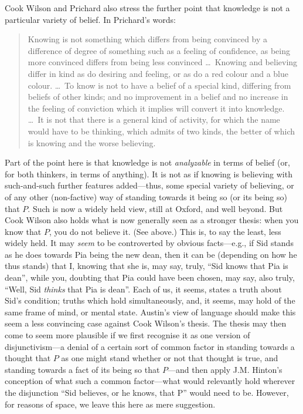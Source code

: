 Cook Wilson and Prichard also stress the further point that knowledge is not a particular variety of belief. In Prichard’s words:
\begin{quote}
	Knowing is not something which differs from being convinced by a difference of degree of something such as a feeling of confidence, as being more convinced differs from being less convinced \ldots\ Knowing and believing differ in kind as do desiring and feeling, or as do a red colour and a blue colour. \ldots\ To know is not to have a belief of a special kind, differing from beliefs of other kinds; and no improvement in a belief and no increase in the feeling of conviction which it implies will convert it into knowledge. \ldots\ It is not that there is a general kind of activity, for which the name would have to be thinking, which admits of two kinds, the better of which is knowing and the worse believing. \citet[87--88]{Prichard:1950tg}
\end{quote}
Part of the point here is that knowledge is not \emph{analyzable} in terms of belief (or, for both thinkers, in terms of anything). It is not as if knowing is believing with such-and-such further features added---thus, some special variety of believing, or of any other (non-factive) way of standing towards it being so (or its being so) that \( P \). Such is now a widely held view, still at Oxford, and well beyond. But Cook Wilson also holds what is now generally seen as a stronger thesis: when you know that \( P \), you do not believe it. (See above.) This is, to say the least, less widely held. It may \emph{seem} to be controverted by obvious facts---e.g., if Sid stands as he does towards Pia being the new dean, then it can be (depending on how he thus stands) that I, knowing that she is, may say, truly, ``Sid knows that Pia is dean'', while you, doubting that Pia could have been chosen, may say, also truly, ``Well, Sid \emph{thinks} that Pia is dean''. Each of us, it seems, states a truth about Sid's condition; truths which hold simultaneously, and, it seems, may hold of the same frame of mind, or mental state. Austin's view of language should make this seem a less convincing case against Cook Wilson's thesis. The thesis may then come to seem more plausible if we first recognise it as one version of disjunctivism---a denial of a certain sort of common factor in standing towards a thought that \( P \) as one might stand whether or not that thought is true, and standing towards a fact of its being so that \( P \)---and then apply J.M. Hinton's \citeyearpar{Hinton:1967bs} conception of what such a common factor---what would relevantly hold wherever the disjunction ``Sid believes, or he knows, that P'' would need to be. However, for reasons of space, we leave this here as mere suggestion.

